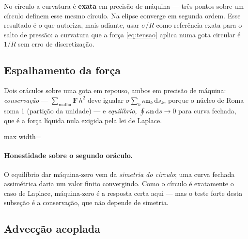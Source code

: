 No c\'irculo a curvatura \'e \textbf{exata} em precis\~ao de m\'aquina --- tr\^es
pontos sobre um c\'irculo definem esse mesmo c\'irculo. Na elipse converge em
segunda ordem. Esse resultado \'e o que autoriza, mais adiante, usar
$\sigma/R$ como refer\^encia exata para o salto de press\~ao: a curvatura que a
for\c{c}a \eqref{eq:tensao} aplica numa gota circular \'e $1/R$ sem erro de
discretiza\c{c}\~ao.

\subsection{Espalhamento da for\c{c}a}

Dois or\'aculos sobre uma gota em repouso, ambos em precis\~ao de m\'aquina:
\emph{conserva\c{c}\~ao} --- $\sum_{\text{malha}} \mathbf{F}\,h^{2}$ deve igualar
$\sigma\sum_k \kappa\mathbf{n}_k\,\mathrm{d}s_k$, porque o n\'ucleo de Roma soma
1 (parti\c{c}\~ao da unidade) --- e \emph{equil\'ibrio}, $\oint \kappa\mathbf{n}\,
\mathrm{d}s \to 0$ para curva fechada, que \'e a for\c{c}a l\'iquida nula exigida
pela lei de Laplace.

\begin{adjustbox}{max width=\linewidth}
\end{adjustbox}

\paragraph{Honestidade sobre o segundo or\'aculo.} O equil\'ibrio dar
m\'aquina-zero vem da \emph{simetria do c\'irculo}; uma curva fechada
assim\'etrica daria um valor finito convergindo. Como o c\'irculo \'e exatamente
o caso de Laplace, m\'aquina-zero \'e a resposta certa aqui --- mas o teste forte
desta subse\c{c}\~ao \'e a conserva\c{c}\~ao, que n\~ao depende de simetria.

\subsection{Advec\c{c}\~ao acoplada}


